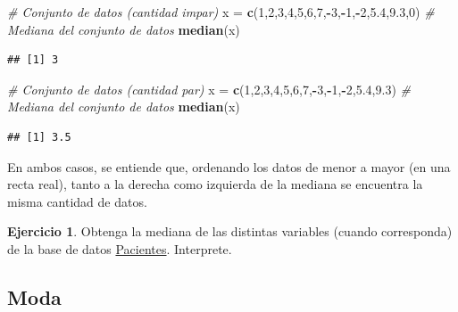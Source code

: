 \documentclass[
  11pt,
]{book}
\newenvironment{Shaded}{\begin{snugshade}}{\end{snugshade}}
\newcommand{\CommentTok}[1]{\textcolor[rgb]{0.56,0.35,0.01}{\textit{#1}}}
\newcommand{\DecValTok}[1]{\textcolor[rgb]{0.00,0.00,0.81}{#1}}
\newcommand{\FloatTok}[1]{\textcolor[rgb]{0.00,0.00,0.81}{#1}}
\newcommand{\FunctionTok}[1]{\textcolor[rgb]{0.13,0.29,0.53}{\textbf{#1}}}
\newcommand{\NormalTok}[1]{#1}
\newcommand{\OtherTok}[1]{\textcolor[rgb]{0.56,0.35,0.01}{#1}}
\newcommand{\SpecialCharTok}[1]{\textcolor[rgb]{0.81,0.36,0.00}{\textbf{#1}}}
\theoremstyle{definition}
\theoremstyle{definition}
\theoremstyle{definition}
\newtheorem{exercise}{Ejercicio}[chapter]
\theoremstyle{definition}
\theoremstyle{remark}
\begin{document}
\begin{Shaded}
\begin{Highlighting}[]
\CommentTok{\# Conjunto de datos (cantidad impar)}
\NormalTok{x }\OtherTok{=} \FunctionTok{c}\NormalTok{(}\DecValTok{1}\NormalTok{,}\DecValTok{2}\NormalTok{,}\DecValTok{3}\NormalTok{,}\DecValTok{4}\NormalTok{,}\DecValTok{5}\NormalTok{,}\DecValTok{6}\NormalTok{,}\DecValTok{7}\NormalTok{,}\SpecialCharTok{{-}}\DecValTok{3}\NormalTok{,}\SpecialCharTok{{-}}\DecValTok{1}\NormalTok{,}\SpecialCharTok{{-}}\DecValTok{2}\NormalTok{,}\FloatTok{5.4}\NormalTok{,}\FloatTok{9.3}\NormalTok{,}\DecValTok{0}\NormalTok{)}
\CommentTok{\# Mediana del conjunto de datos}
\FunctionTok{median}\NormalTok{(x)}
\end{Highlighting}
\end{Shaded}

\begin{verbatim}
## [1] 3
\end{verbatim}

\begin{Shaded}
\begin{Highlighting}[]
\CommentTok{\# Conjunto de datos (cantidad par)}
\NormalTok{x }\OtherTok{=} \FunctionTok{c}\NormalTok{(}\DecValTok{1}\NormalTok{,}\DecValTok{2}\NormalTok{,}\DecValTok{3}\NormalTok{,}\DecValTok{4}\NormalTok{,}\DecValTok{5}\NormalTok{,}\DecValTok{6}\NormalTok{,}\DecValTok{7}\NormalTok{,}\SpecialCharTok{{-}}\DecValTok{3}\NormalTok{,}\SpecialCharTok{{-}}\DecValTok{1}\NormalTok{,}\SpecialCharTok{{-}}\DecValTok{2}\NormalTok{,}\FloatTok{5.4}\NormalTok{,}\FloatTok{9.3}\NormalTok{)}
\CommentTok{\# Mediana del conjunto de datos}
\FunctionTok{median}\NormalTok{(x)}
\end{Highlighting}
\end{Shaded}

\begin{verbatim}
## [1] 3.5
\end{verbatim}

En ambos casos, se entiende que, ordenando los datos de menor a mayor (en una recta real), tanto a la derecha como izquierda de la mediana se encuentra la misma cantidad de datos.

\begin{exercise}
Obtenga la mediana de las distintas variables (cuando corresponda) de la base de datos \hyperref[Pacientes]{Pacientes}. Interprete.
\end{exercise}

\subsection{Moda}\label{topicos-medidas-localizacion-moda}
\end{document}
